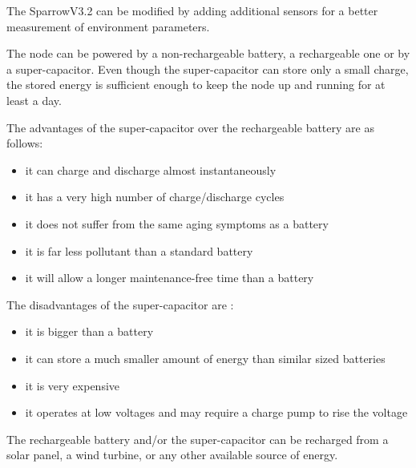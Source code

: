 The SparrowV3.2 can be modified by adding additional sensors for a better measurement of environment parameters.

The node can be powered by a non-rechargeable battery, a rechargeable one or by a super-capacitor. Even though the super-capacitor can store only a small charge, the stored energy is sufficient enough to keep the node up and running for at least a day.

The advantages of the super-capacitor over the rechargeable battery are as follows:

\begin{itemize}
\item it can charge and discharge almost instantaneously 
\item it has a very high number of charge/discharge cycles 
\item it does not suffer from the same aging symptoms as a battery
\item it is far less pollutant than a standard battery
\item it will allow a longer maintenance-free time than a battery

\end{itemize}

The disadvantages of the super-capacitor are :

\begin{itemize}
\item it is bigger than a battery
\item it can store a much smaller amount of energy than similar sized batteries
\item it is very expensive
\item it operates at low voltages and may require a charge pump to rise the voltage

\end{itemize}

The rechargeable battery and/or the super-capacitor can be recharged from a solar panel, a wind turbine, or any other available source of energy.

